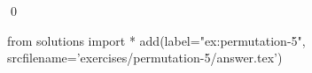 
\begin{ex} 
  \label{ex:permutation-5}
  
  \qed
\end{ex} 
\begin{python0}
from solutions import *
add(label="ex:permutation-5",
    srcfilename='exercises/permutation-5/answer.tex') 
\end{python0}
